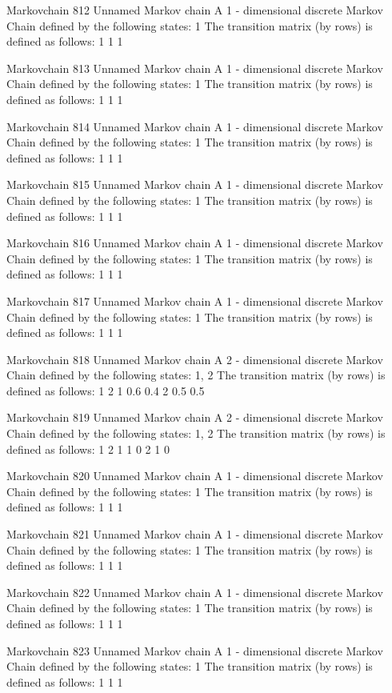 \documentclass[
  nojss]{jss}
\begin{document}
\begin{CodeChunk}
\begin{CodeOutput}
Markovchain  812 
Unnamed Markov chain 
 A  1 - dimensional discrete Markov Chain defined by the following states: 
 1 
 The transition matrix  (by rows)  is defined as follows: 
  1
1 1

Markovchain  813 
Unnamed Markov chain 
 A  1 - dimensional discrete Markov Chain defined by the following states: 
 1 
 The transition matrix  (by rows)  is defined as follows: 
  1
1 1

Markovchain  814 
Unnamed Markov chain 
 A  1 - dimensional discrete Markov Chain defined by the following states: 
 1 
 The transition matrix  (by rows)  is defined as follows: 
  1
1 1

Markovchain  815 
Unnamed Markov chain 
 A  1 - dimensional discrete Markov Chain defined by the following states: 
 1 
 The transition matrix  (by rows)  is defined as follows: 
  1
1 1

Markovchain  816 
Unnamed Markov chain 
 A  1 - dimensional discrete Markov Chain defined by the following states: 
 1 
 The transition matrix  (by rows)  is defined as follows: 
  1
1 1

Markovchain  817 
Unnamed Markov chain 
 A  1 - dimensional discrete Markov Chain defined by the following states: 
 1 
 The transition matrix  (by rows)  is defined as follows: 
  1
1 1

Markovchain  818 
Unnamed Markov chain 
 A  2 - dimensional discrete Markov Chain defined by the following states: 
 1, 2 
 The transition matrix  (by rows)  is defined as follows: 
    1   2
1 0.6 0.4
2 0.5 0.5

Markovchain  819 
Unnamed Markov chain 
 A  2 - dimensional discrete Markov Chain defined by the following states: 
 1, 2 
 The transition matrix  (by rows)  is defined as follows: 
  1 2
1 1 0
2 1 0

Markovchain  820 
Unnamed Markov chain 
 A  1 - dimensional discrete Markov Chain defined by the following states: 
 1 
 The transition matrix  (by rows)  is defined as follows: 
  1
1 1

Markovchain  821 
Unnamed Markov chain 
 A  1 - dimensional discrete Markov Chain defined by the following states: 
 1 
 The transition matrix  (by rows)  is defined as follows: 
  1
1 1

Markovchain  822 
Unnamed Markov chain 
 A  1 - dimensional discrete Markov Chain defined by the following states: 
 1 
 The transition matrix  (by rows)  is defined as follows: 
  1
1 1

Markovchain  823 
Unnamed Markov chain 
 A  1 - dimensional discrete Markov Chain defined by the following states: 
 1 
 The transition matrix  (by rows)  is defined as follows: 
  1
1 1


\end{CodeOutput}
\end{CodeChunk}
\end{document}

